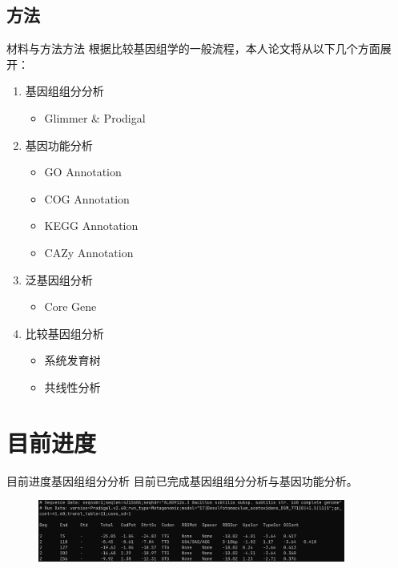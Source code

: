 \documentclass{beamer}
\begin{document}
	\subsection{方法}
	\begin{frame}{材料与方法}{方法}
		根据比较基因组学的一般流程，本人论文将从以下几个方面展开：
		\begin{enumerate}
			\item 基因组组分分析
				\begin{itemize}
					\item Glimmer \& Prodigal
				\end{itemize}
			\item 基因功能分析
				\begin{itemize}
					\item GO Annotation
					\item COG Annotation
					\item KEGG Annotation
					\item CAZy Annotation
				\end{itemize}
			\item 泛基因组分析
				\begin{itemize}
					\item Core Gene
				\end{itemize}
			\item 比较基因组分析
				\begin{itemize}
					\item 系统发育树
					\item 共线性分析
				\end{itemize}
		\end{enumerate}
	\end{frame}

	\section{目前进度}
	\begin{frame}{目前进度}{基因组组分分析}
		目前已完成基因组组分分析与基因功能分析。
		\begin{figure}
			\centering
			\includegraphics[width=0.9\textwidth]{figure/genome_contene.png}
		\end{figure}
	\end{frame}
\end{document}
